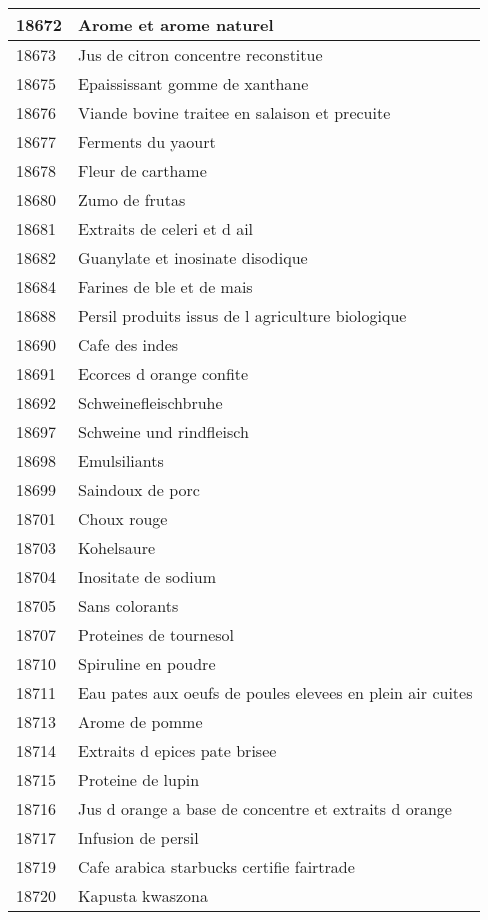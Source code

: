 \begin{longtable}{|l|l|}
18672 & Arome et arome naturel \\ \hline 
18673 & Jus de citron concentre reconstitue \\ \hline 
18675 & Epaississant gomme de xanthane \\ \hline 
18676 & Viande bovine traitee en salaison et precuite \\ \hline 
18677 & Ferments du yaourt \\ \hline 
18678 & Fleur de carthame \\ \hline 
18680 & Zumo de frutas \\ \hline 
18681 & Extraits de celeri et d ail \\ \hline 
18682 & Guanylate et inosinate disodique \\ \hline 
18684 & Farines de ble et de mais \\ \hline 
18688 & Persil  produits issus de l agriculture biologique \\ \hline 
18690 & Cafe des indes \\ \hline 
18691 & Ecorces d orange confite \\ \hline 
18692 & Schweinefleischbruhe \\ \hline 
18697 & Schweine und rindfleisch \\ \hline 
18698 & Emulsiliants \\ \hline 
18699 & Saindoux de porc \\ \hline 
18701 & Choux rouge \\ \hline 
18703 & Kohelsaure \\ \hline 
18704 & Inositate de sodium \\ \hline 
18705 & Sans colorants \\ \hline 
18707 & Proteines de tournesol \\ \hline 
18710 & Spiruline en poudre \\ \hline 
18711 & Eau pates aux oeufs de poules elevees en plein air cuites \\ \hline 
18713 & Arome de pomme \\ \hline 
18714 & Extraits d epices pate brisee \\ \hline 
18715 & Proteine de lupin \\ \hline 
18716 & Jus d orange a base de concentre et extraits d orange \\ \hline 
18717 & Infusion de persil \\ \hline 
18719 & Cafe arabica starbucks certifie fairtrade \\ \hline 
18720 & Kapusta kwaszona \\ \hline 

\end{longtable}
